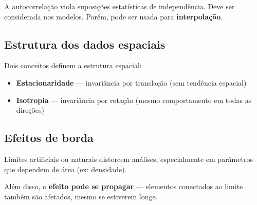 A autocorrelação viola suposições estatísticas de independência. Deve ser considerada nos modelos. Porém, pode ser usada para \textbf{interpolação}.

\subsection{Estrutura dos dados espaciais}

Dois conceitos definem a estrutura espacial:

\begin{itemize}
 \item \textbf{Estacionaridade} — invariância por translação (sem tendência espacial)
 \item \textbf{Isotropia} — invariância por rotação (mesmo comportamento em todas as direções)
\end{itemize}

\subsection{Efeitos de borda}

Limites artificiais ou naturais distorcem análises, especialmente em parâmetros que dependem de área (ex: densidade).

Além disso, o \textbf{efeito pode se propagar} — elementos conectados ao limite também são afetados, mesmo se estiverem longe.

\pagestyle{empty}
